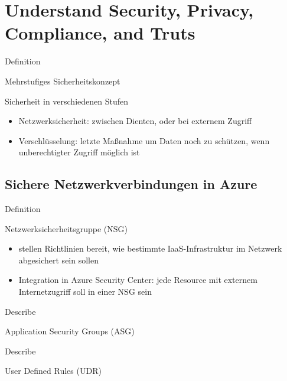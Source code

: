 \documentclass{scrartcl}
\newenvironment{flashcard}[2][]{%
    #1
    \vfill
    \centerline{\Large{#2}}
    \vfill
\newpage
}
{\newpage}
\newcommand{\sectioncard}[1]{
    \vspace*{\stretch{1}}
    \section{#1}
    \vspace*{\stretch{1}}
    \pagebreak
}
\newcommand{\subsectioncard}[1]{
    \vspace*{\stretch{1}}
    \subsection{#1}
    \vspace*{\stretch{1}}
    \pagebreak
}
\begin{document}
    \sectioncard{Understand Security, Privacy, Compliance, and Truts}

    \begin{flashcard}[Definition]{Mehrstufiges Sicherheitskonzept}
        Sicherheit in verschiedenen Stufen
        \begin{itemize}
            \item Netzwerksicherheit: zwischen Dienten, oder bei externem Zugriff
            \item Verschlüsselung: letzte Maßnahme um Daten noch zu schützen, wenn unberechtigter Zugriff möglich ist
        \end{itemize}
    \end{flashcard}

    \subsectioncard{Sichere Netzwerkverbindungen in Azure}

    \begin{flashcard}[Definition]{Netzwerksicherheitsgruppe (NSG)}
        \begin{itemize}
            \item stellen Richtlinien bereit, wie bestimmte IaaS-Infrastruktur im Netzwerk abgesichert sein sollen
            \item Integration in Azure Security Center: jede Resource mit externem Internetzugriff soll in einer NSG sein
        \end{itemize}

    \end{flashcard}

    \begin{flashcard}[Describe]{Application Security Groups (ASG)}

    \end{flashcard}

    \begin{flashcard}[Describe]{User Defined Rules (UDR)}

    \end{flashcard}
\end{document}
